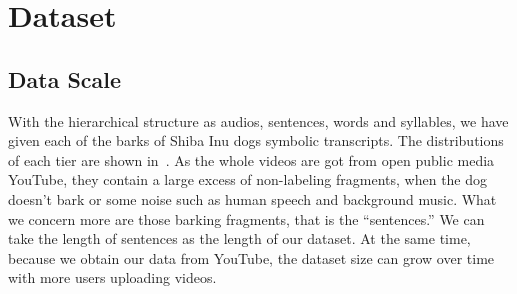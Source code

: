 \section{Dataset}
\subsection{Data Scale}

With the hierarchical structure as audios, sentences, words and syllables, 
we have given each of the barks of Shiba Inu dogs symbolic transcripts. 
The distributions of each tier are shown in~. As the whole videos are got from open public media YouTube, they contain a large excess of non-labeling fragments, when the dog doesn't bark or some noise such as human speech and background music. What we concern more are those barking fragments, that is the ``sentences.'' We can take the length of sentences as the length of our dataset. At the same time, because we obtain our data from YouTube, the dataset size can grow over time with more users uploading videos.


